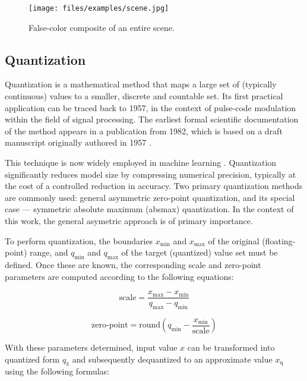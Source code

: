 {\begin{figure}[H]
  \centering
  \texttt{[image: files/examples/scene.jpg]}
  \caption{False-color composite of an entire scene.}
  \label{fig:false_color_scene}
\end{figure}

\subsection{Quantization}
\label{subsec:quantization}

Quantization is a mathematical method that maps a large set of (typically continuous) values to a smaller, discrete and countable set.
Its first practical application can be traced back to 1957, in the context of pulse-code modulation within the field of signal processing.
The earliest formal scientific documentation of the method appears in a publication from 1982,
which is based on a draft manuscript originally authored in 1957 \cite{firstQuantization}.

This technique is now widely employed in machine learning \cite{MLQuantization1, MLQuantization2}.
Quantization significantly reduces model size by compressing numerical precision, typically at the cost of a controlled reduction in accuracy.
Two primary quantization methods are commonly used: general asymmetric zero-point quantization, and its special case ---
symmetric absolute maximum (absmax) quantization.
In the context of this work, the general asymetric approach is of primary importance.

To perform quantization, the boundaries \( x_{\text{min}} \) and \( x_{\text{max}} \) of the original (floating-point) range,
and \( q_{\text{min}} \) and \( q_{\text{max}} \) of the target (quantized) value set must be defined.
Once these are known, the corresponding scale and zero-point parameters are computed according to the following equations:

\begin{equation}
\text{scale} = \frac{x_{\text{max}} - x_{\text{min}}}{q_{\text{max}} - q_{\text{min}}}
\label{eq:scale}
\end{equation}

\begin{equation}
\text{zero-point} = \text{round}\left( q_{\text{min}} - \frac{x_{\text{min}}}{\text{scale}} \right)
\label{eq:zeropoint}
\end{equation}

With these parameters determined,
input value \( x \) can be transformed into quantized form \( q_{\text{x}} \) and subsequently dequantized to an approximate value \( x_{\text{q}} \) using the following formulas:

}
